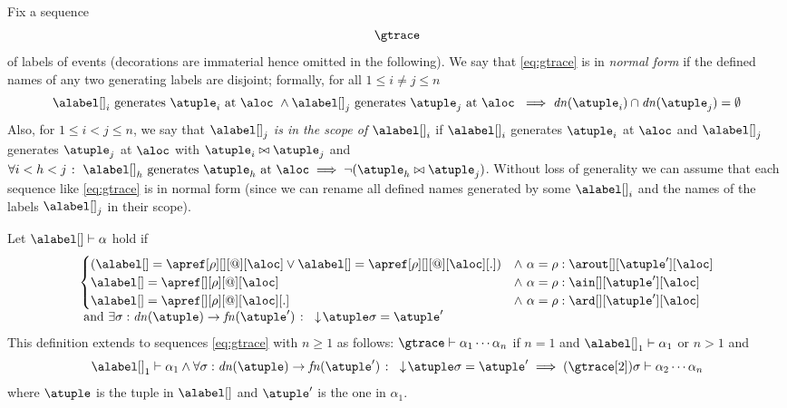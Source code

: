Fix a sequence
\begin{align}
  \label{eq:gtrace}
  \gtrace  
\end{align}
of labels of events (decorations are immaterial hence omitted in the
following).
%
We say that \eqref{eq:gtrace} is in \emph{normal form} if the defined
names of any two generating labels are disjoint; formally, for all
$1 \leq i \neq j \leq n$
%
\[
  \alabel[]_i \text{ generates
  $\atuple_i$ at $\aloc$ } \land \alabel[]_j \text{ generates
  $\atuple_j$ at $\aloc$ } \implies \dn{\atuple_i} \cap \dn{\atuple_j}
= \emptyset
\]
%
Also, for $1 \leq i < j \leq n$, we say that $\alabel[]_j$ \emph{is in
  the scope of $\alabel[]_i$} if $\alabel[]_i$ generates $\atuple_i$
at $\aloc$ and $\alabel[]_j$ generates $\atuple_j$ at $\aloc$ with
$\atuple_i \matches \atuple_j$ and
$\forall i < h < j \qst \alabel[]_h \text{ generates } \atuple_h
\text{ at } \aloc \implies \neg(\atuple_h \matches \atuple_j)$.
%
Without loss of generality we can assume that each sequence like
\eqref{eq:gtrace} is in normal form (since we can rename all defined
names generated by some $\alabel[]_i$ and the names of the labels
$\alabel[]_j$ in their scope).

Let $\alabel[] \vdash \alpha$ hold if
\[\begin{array}{l}
  \begin{cases}
    (\alabel[] = \apref[\arole][][@][\aloc] \vee \alabel[] = \apref[\arole][][@][\aloc][.]) & \land\ \alpha = \arole : \arout[][\atuple'][\aloc]
    \\
    \alabel[] = \apref[][\arole][@][\aloc] & \land\ \alpha = \arole : \ain[][\atuple'][\aloc]
    \\
    \alabel[] = \apref[][\arole][@][\aloc][.] & \land\ \alpha = \arole : \ard[][\atuple'][\aloc]
  \end{cases}
    \\
  \text{ and }
  \exists \sigma: \dn{\atuple} \to \fn{\atuple'} \qst \eraseB{\atuple}\sigma = \atuple'
  \end{array}
\]
This definition extends to sequences \eqref{eq:gtrace} with $n \geq 1$
as follows:
$\gtrace \vdash \alpha_1 \cdots \alpha_n$ if
$n = 1$  and $\alabel[]_1 \vdash \alpha_1$ or
$n > 1$ and
\[
  \alabel[]_1 \vdash \alpha_1 \land  \forall \sigma: \dn{\atuple} \to \fn{\atuple'} \qst \eraseB{\atuple}\sigma = \atuple'
  \implies (\gtrace[2])\sigma \vdash \alpha_2 \cdots \alpha_n
\]
where $\atuple$ is the tuple in $\alabel[]$ and $\atuple'$ is the one in $\alpha_1$.

